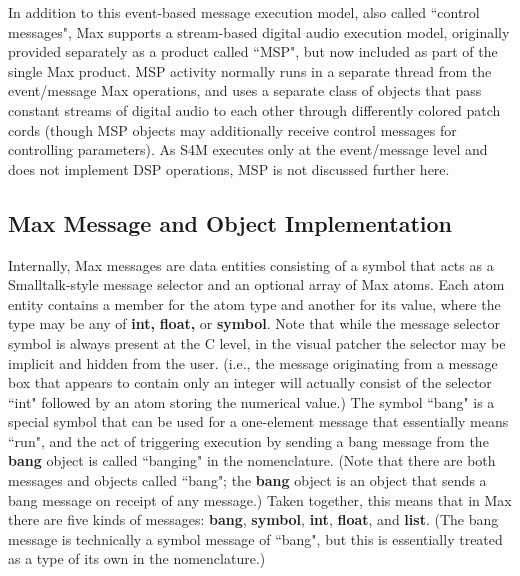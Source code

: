 \documentclass[acmsmall]{acmart}
\begin{document}
In addition to this event-based message execution model, also called ``control messages", Max 
supports a stream-based digital 
audio execution model, originally provided separately as a product called ``MSP", but now included 
as part of the single Max product.
MSP activity normally runs in a separate thread from the event/message Max operations, and uses 
a separate class of objects that pass constant streams of digital audio to each other through differently 
colored patch cords (though MSP objects may additionally receive control messages for controlling parameters). As  
S4M executes only at the event/message level and does not implement DSP operations, MSP is not 
discussed further here. 


\subsection{Max Message and Object Implementation} 

Internally, Max messages are data entities consisting of a symbol that acts
as a Smalltalk-style message selector and an optional array of Max atoms. 
Each atom entity contains a member for the atom type and another for its value, 
where the type may be any of \textbf{int,} \textbf{float,} or \textbf{symbol}. 
Note that while the message selector symbol is always present at the C level,
in the visual patcher the selector may be implicit and hidden from the user. 
(i.e., the message originating from a message box that appears to contain only an integer
will actually consist of the selector ``int" followed by an atom storing the numerical value.)
The symbol ``bang" is a special symbol that can be used for a one-element message 
that essentially means ``run", and the act of triggering execution by sending a bang
message from the \textbf{bang} object is called ``banging" in the nomenclature.
(Note that there are both messages and objects called ``bang"; the \textbf{bang} 
object is an object that sends a bang message on receipt of any message.)
Taken together, this means that in Max there are five kinds of messages: 
\textbf{bang}, \textbf{symbol}, \textbf{int}, \textbf{float}, and \textbf{list}. 
\cite{Puckette2002}
(The bang message is technically a symbol message
of ``bang", but this is essentially treated as a type of its own in the nomenclature.) 
\end{document}
